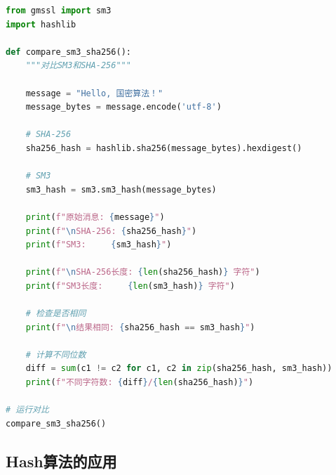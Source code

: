 \documentclass[12pt,a4paper]{article}
\begin{document}
\begin{lstlisting}[language=Python]
from gmssl import sm3
import hashlib

def compare_sm3_sha256():
    """对比SM3和SHA-256"""
    
    message = "Hello, 国密算法！"
    message_bytes = message.encode('utf-8')
    
    # SHA-256
    sha256_hash = hashlib.sha256(message_bytes).hexdigest()
    
    # SM3
    sm3_hash = sm3.sm3_hash(message_bytes)
    
    print(f"原始消息: {message}")
    print(f"\nSHA-256: {sha256_hash}")
    print(f"SM3:     {sm3_hash}")
    
    print(f"\nSHA-256长度: {len(sha256_hash)} 字符")
    print(f"SM3长度:     {len(sm3_hash)} 字符")
    
    # 检查是否相同
    print(f"\n结果相同: {sha256_hash == sm3_hash}")
    
    # 计算不同位数
    diff = sum(c1 != c2 for c1, c2 in zip(sha256_hash, sm3_hash))
    print(f"不同字符数: {diff}/{len(sha256_hash)}")

# 运行对比
compare_sm3_sha256()
\end{lstlisting}

\subsection{Hash算法的应用}
\end{document}
